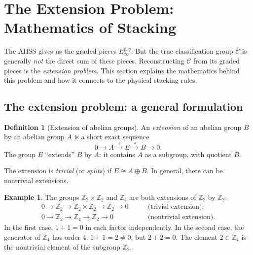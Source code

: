 \documentclass{SciPost}
\theoremstyle{definition}
\newtheorem{definition}[theorem]{Definition}
\newtheorem{example}[theorem]{Example}
\newcommand{\Zt}{\mathbb{Z}_2}
\newcommand{\Zn}[1]{\mathbb{Z}_{#1}}
\begin{document}
\section{The Extension Problem: Mathematics of Stacking}
\label{sec:extension}

The AHSS gives us the graded pieces $E_\infty^{p,q}$.
But the true classification group $\mathcal{C}$ is generally \emph{not} the direct sum of these pieces.
Reconstructing $\mathcal{C}$ from its graded pieces is the \emph{extension problem}.
This section explains the mathematics behind this problem and how it connects to the physical stacking rules.

\subsection{The extension problem: a general formulation}
\label{subsec:extension-general}

\begin{definition}[Extension of abelian groups]
An \emph{extension} of an abelian group $B$ by an abelian group $A$ is a short exact sequence
\begin{equation}
\label{eq:ses}
0 \longrightarrow A \xrightarrow{\iota} E \xrightarrow{\pi} B \longrightarrow 0.
\end{equation}
The group $E$ ``extends'' $B$ by $A$: it contains $A$ as a subgroup, with quotient $B$.
\end{definition}

The extension is \emph{trivial} (or \emph{splits}) if $E \cong A \oplus B$.
In general, there can be nontrivial extensions.

\begin{example}
The groups $\Zt \times \Zt$ and $\Zn{4}$ are both extensions of $\Zt$ by $\Zt$:
\begin{align}
0 \to \Zt \to \Zt \times \Zt \to \Zt \to 0 &\qquad \text{(trivial extension)}, \\
0 \to \Zt \to \Zn{4} \to \Zt \to 0 &\qquad \text{(nontrivial extension)}.
\end{align}
In the first case, $1 + 1 = 0$ in each factor independently.
In the second case, the generator of $\Zn{4}$ has order 4: $1 + 1 = 2 \neq 0$, but $2 + 2 = 0$.
The element $2 \in \Zn{4}$ is the nontrivial element of the subgroup $\Zt$.
\end{example}
\end{document}

